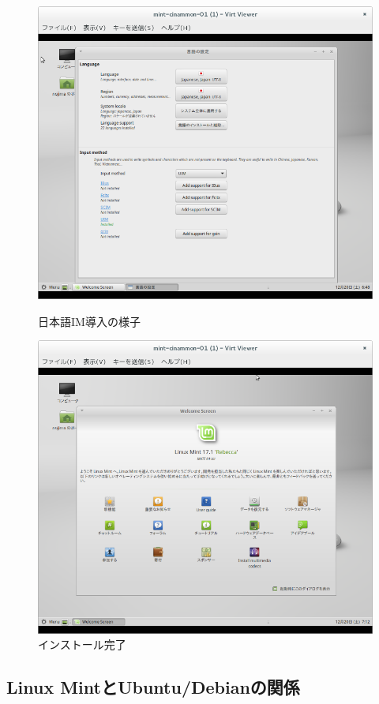 \documentclass[mingoth,a4paper]{jsarticle}
\begin{document}
\begin{figure}[H]
\begin{minipage}{0.5\hsize}
\centering
\includegraphics[width=0.8\hsize]{image201412/mint-im-setup.png}
\caption{日本語IM導入の様子}\label{fig:mint-im-setup}
\end{minipage}
\begin{minipage}{0.5\hsize}
\centering
\includegraphics[width=0.8\hsize]{image201412/mint-setupcomplete.png}
\caption{インストール完了}\label{fig:mint-setupcomplete}
\end{minipage}
\end{figure}

 \subsection{Linux MintとUbuntu/Debianの関係}
\end{document}
